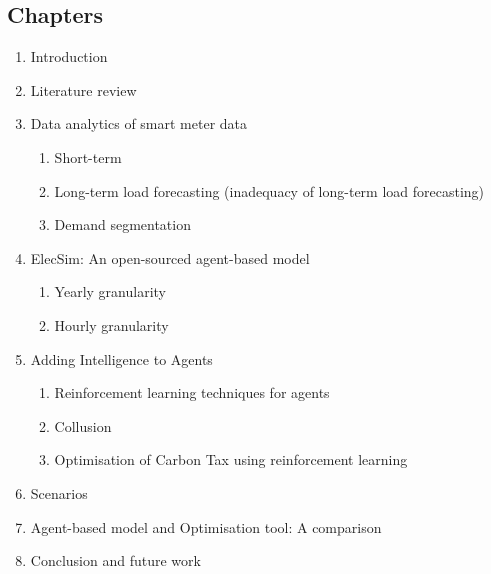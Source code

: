\documentclass[12pt]{article}
\begin{document}
\subsection{Chapters}
\begin{enumerate}

  \item Introduction
  \item Literature review
  \item Data analytics of smart meter data
  \begin{enumerate}
	  \item Short-term 
	  \item Long-term load forecasting (inadequacy of long-term load forecasting)
	  \item Demand segmentation
  \end{enumerate}
  \item ElecSim: An open-sourced agent-based model
    \begin{enumerate}
	  \item Yearly granularity
	  \item Hourly granularity
  \end{enumerate}
  \item Adding Intelligence to Agents
  \begin{enumerate}
	  \item Reinforcement learning techniques for agents
	  \item Collusion
	  \item Optimisation of Carbon Tax using reinforcement learning
  \end{enumerate}
  \item Scenarios
  \item Agent-based model and Optimisation tool: A comparison
  \item Conclusion and future work
  
\end{enumerate}












\clearpage



\end{document}
